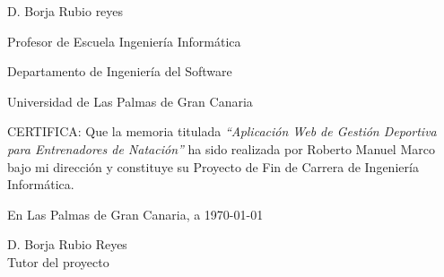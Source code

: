 %
%

\begin{center}
	\begin{minipage}[t][6cm][l]{.8\textwidth}
		\begin{center}
			D. {\sc Borja Rubio reyes}

			Profesor de Escuela Ingeniería Informática

			Departamento de Ingeniería del Software

			Universidad de Las Palmas de Gran Canaria
		\end{center}
	\end{minipage}
\end{center}

CERTIFICA:
Que la memoria titulada {\it ``Aplicación Web de Gestión Deportiva para Entrenadores de Natación''} ha sido realizada por {\sc Roberto Manuel Marco} bajo mi dirección y constituye su Proyecto de Fin de Carrera de Ingeniería Informática.

\vspace{5cm}

En Las Palmas de Gran Canaria, a \today

\vspace{3cm}

\begin{center}
	\begin{minipage}[t][4cm][l]{.5\textwidth}
	D. {\sc Borja Rubio Reyes}
	\\
	Tutor del proyecto
	\end{minipage}
\end{center}
